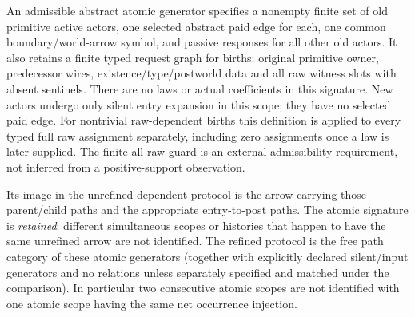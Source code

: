 \documentclass[11pt]{article}
\begin{document}
An admissible abstract atomic generator specifies a nonempty finite set of old primitive active actors, one selected abstract paid edge for each, one common boundary/world-arrow symbol, and passive responses for all other old actors. It also retains a finite typed request graph for births: original primitive owner, predecessor wires, existence/type/postworld data and all raw witness slots with absent sentinels. There are no laws or actual coefficients in this signature. New actors undergo only silent entry expansion in this scope; they have no selected paid edge. For nontrivial raw-dependent births this definition is applied to every typed full raw assignment separately, including zero assignments once a law is later supplied. The finite all-raw guard is an external admissibility requirement, not inferred from a positive-support observation.

Its image in the unrefined dependent protocol is the arrow carrying those parent/child paths and the appropriate entry-to-post paths. The atomic signature is \emph{retained}: different simultaneous scopes or histories that happen to have the same unrefined arrow are not identified. The refined protocol is the free path category of these atomic generators (together with explicitly declared silent/input generators and no relations unless separately specified and matched under the comparison). In particular two consecutive atomic scopes are not identified with one atomic scope having the same net occurrence injection.
\end{document}
